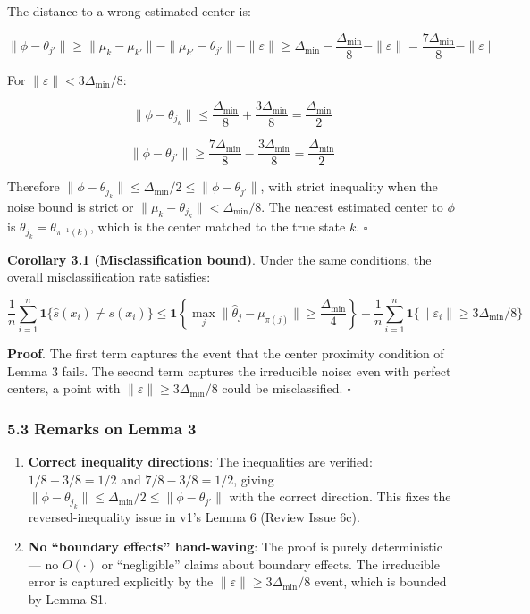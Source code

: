 \documentclass[
  12pt,
]{ctexart}
\begin{document}
The distance to a wrong estimated center is:

\[\|\phi - \theta_{j'}\| \geq \|\mu_k - \mu_{k'}\| - \|\mu_{k'} - \theta_{j'}\| - \|\varepsilon\| \geq \Delta_{\min} - \frac{\Delta_{\min}}{8} - \|\varepsilon\| = \frac{7\Delta_{\min}}{8} - \|\varepsilon\|\]

For \(\|\varepsilon\| < 3\Delta_{\min}/8\):

\[\|\phi - \theta_{j_k}\| \leq \frac{\Delta_{\min}}{8} + \frac{3\Delta_{\min}}{8} = \frac{\Delta_{\min}}{2}\]

\[\|\phi - \theta_{j'}\| \geq \frac{7\Delta_{\min}}{8} - \frac{3\Delta_{\min}}{8} = \frac{\Delta_{\min}}{2}\]

Therefore
\(\|\phi - \theta_{j_k}\| \leq \Delta_{\min}/2 \leq \|\phi - \theta_{j'}\|\),
with strict inequality when the noise bound is strict or
\(\|\mu_k - \theta_{j_k}\| < \Delta_{\min}/8\). The nearest estimated
center to \(\phi\) is \(\theta_{j_k} = \theta_{\pi^{-1}(k)}\), which is
the center matched to the true state \(k\). \(\square\)

\textbf{Corollary 3.1 (Misclassification bound)}. Under the same
conditions, the overall misclassification rate satisfies:

\[\frac{1}{n}\sum_{i=1}^n \mathbf{1}\{\hat{s}(x_i) \neq s(x_i)\}
\leq \mathbf{1}\left\{\max_j \|\hat{\theta}_j - \mu_{\pi(j)}\| \geq \frac{\Delta_{\min}}{4}\right\}
+ \frac{1}{n}\sum_{i=1}^n \mathbf{1}\{\|\varepsilon_i\| \geq 3\Delta_{\min}/8\}\]

\textbf{Proof}. The first term captures the event that the center
proximity condition of Lemma 3 fails. The second term captures the
irreducible noise: even with perfect centers, a point with
\(\|\varepsilon\| \geq 3\Delta_{\min}/8\) could be misclassified.
\(\square\)

\subsubsection{5.3 Remarks on Lemma 3}\label{remarks-on-lemma-3}

\begin{enumerate}
\def\labelenumi{\arabic{enumi}.}
\item
  \textbf{Correct inequality directions}: The inequalities are verified:
  \(1/8 + 3/8 = 1/2\) and \(7/8 - 3/8 = 1/2\), giving
  \(\| \phi - \theta_{j_k} \| \leq \Delta_{\min}/2 \leq \|\phi - \theta_{j'}\|\)
  with the correct direction. This fixes the reversed-inequality issue
  in v1's Lemma 6 (Review Issue 6c).
\item
  \textbf{No ``boundary effects'' hand-waving}: The proof is purely
  deterministic --- no \(O(\cdot)\) or ``negligible'' claims about
  boundary effects. The irreducible error is captured explicitly by the
  \(\|\varepsilon\| \geq 3\Delta_{\min}/8\) event, which is bounded by
  Lemma S1.
\end{enumerate}
\end{document}

